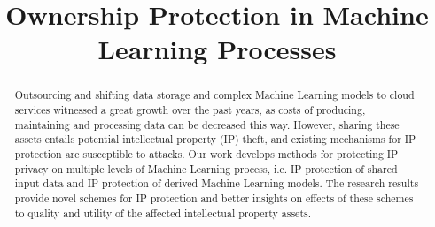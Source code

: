 \documentclass[conference]{IEEEtran}
\begin{document}
\title{Ownership Protection in Machine Learning Processes}

\author{
}

\maketitle

\begin{abstract}
Outsourcing and shifting data storage and complex Machine Learning models to cloud services witnessed a great growth over the past years, as costs of producing, maintaining and processing data can be decreased this way. 
However, sharing these assets entails potential intellectual property (IP) theft, and existing mechanisms for IP protection are susceptible to attacks. 
Our work develops methods for protecting IP privacy on multiple levels of Machine Learning process, i.e. IP protection of shared input data and IP protection of derived Machine Learning models. 
The research results provide novel schemes for IP protection and better insights on effects of these schemes to quality and utility of the affected intellectual property assets.
\end{abstract}
\end{document}
